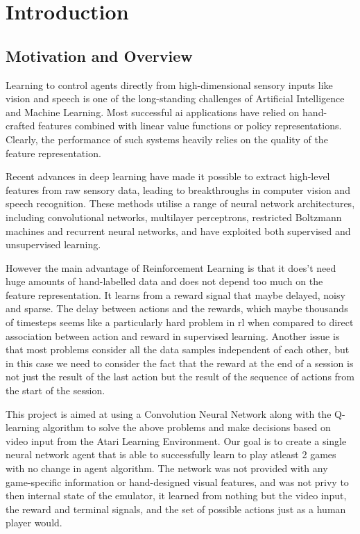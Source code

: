 \documentclass[a4paper,11pt]{report}
\begin{document}
	\chapter{Introduction}
		\section{Motivation and Overview}
			Learning to control agents directly from high-dimensional sensory inputs like vision and speech is one of the long-standing challenges of Artificial Intelligence and Machine Learning. Most successful \ac{ai} applications have relied on hand-crafted features combined with linear value functions or policy representations. Clearly, the performance of such systems heavily relies on the quality of the feature representation.

			Recent advances in deep learning have made it possible to extract high-level features from raw sensory data, leading to breakthroughs in computer vision and speech recognition. These methods utilise a range of neural network architectures, including convolutional networks, multilayer perceptrons, restricted Boltzmann machines and recurrent neural networks, and have exploited both supervised and unsupervised learning.
	
			However the main advantage of Reinforcement Learning is that it does't need huge amounts of hand-labelled data and does not depend too much on the feature representation. It learns from a reward signal that maybe delayed, noisy and sparse. The delay between actions and the rewards, which maybe thousands of timesteps seems like a particularly hard problem in \ac{rl} when compared to direct association between action and reward in supervised learning. Another issue is that most problems consider all the data samples independent of each other, but in this case we need to consider the fact that the reward at the end of a session is not just the result of the last action but the result of the sequence of actions from the start of the session.

			This project is aimed at using a Convolution Neural Network along with the Q-learning algorithm to solve the above problems and make decisions based on video input from the Atari Learning Environment. Our goal is to create a single neural network agent that is able to successfully learn to play atleast 2 games with no change in agent algorithm. The network was not provided with any game-specific information or hand-designed visual features, and was not privy to then internal state of the emulator, it learned from nothing but the video input, the reward and terminal signals, and the set of possible actions just as a human player would.
\end{document}
